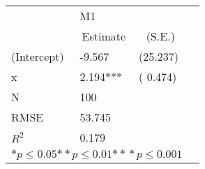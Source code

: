 \begin{tabular}{@{}l*{3}{l}@{}}
\hline
  &\multicolumn{2}{l}{M1  }\tabularnewline
 &\multicolumn{1}{c}{Estimate}&\multicolumn{1}{c}{(S.E.)}\tabularnewline
 \hline
 \hline
  (Intercept) & -9.567 & (25.237) \tabularnewline
  x & 2.194*** & ( 0.474) \tabularnewline
 \hline
 N&\multicolumn{1}{l}{100}  & \tabularnewline
 RMSE&53.745\tabularnewline
 $R^2$&0.179\tabularnewline
 \hline
\hline
 
 \multicolumn{3}{l}{  ${*  p}\le 0.05$${*\!\!*  p}\le 0.01$${*\!\!*\!\!*  p}\le 0.001$}\tabularnewline
 \end{tabular}